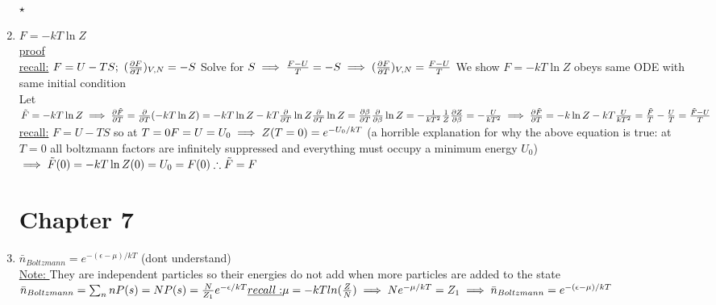 \documentclass[12pt]{amsart}
\begin{document}
\begin{enumerate}
$\star$
\item \underline{$F= - k T \ln Z$}\\
\underline{proof}\\
\underline{recall:} $F = U - TS;\,\, (\frac{\partial F}{\partial T})_{V,N} = - S\\$
Solve for $S \implies \frac{F-U}{T} = - S\\
\implies (\frac{\partial F}{\partial T})_{V,N} = \frac{F- U}{T}\\$
We show $F = - kT \ln Z$ obeys same ODE with same initial condition\\
Let $\tilde{F} = - k T \ln Z\\
\implies \frac{\partial \tilde{F}}{\partial T} = \frac{\partial}{\partial T} (- k T \ln Z) = - k T \ln Z - k T \frac{\partial}{\partial T} \ln Z\\
\frac{\partial}{\partial T} \ln Z = \frac{\partial \beta}{\partial T} \frac{\partial}{\partial \beta} \ln Z\\
=- \frac{1}{kT^2} \frac{1}{Z} \frac{\partial Z}{\partial \beta} = - \frac{U}{k T^2}\\
\implies \frac{\partial \tilde{F}}{\partial T} = - k \ln Z - k T \frac{U}{k T^2} = \frac{\tilde{F}}{T} - \frac{U}{T} = \frac{\tilde{F} - U}{T}$\\
\underline{recall:} $F= U - TS$ so at $T=0 F=U = U_0\\
\implies Z(T=0) = e^{-U_0/kT}\\$
(a horrible explanation for why the above equation is true: at $T=0$ all boltzmann factors are infinitely suppressed and everything must occupy a minimum energy $U_0$)\\
$\implies \tilde{F}(0) = - k T \ln Z(0) = U_0 = F(0)\\
\therefore \tilde{F} = F$


\hdashrule[0.5ex][c]{\linewidth}{0.5pt}{1.5mm}



\section*{Chapter 7}

\item \underline{$\bar{n}_{Boltzmann}=e^{-(\epsilon-\mu)/kT}$} (dont understand)\\
\underline{Note: } They are independent particles so their energies do not add when more particles are added to the state\\
$\bar{n}_{Boltzmann}=\sum_n n P(s)=N P(s)=\frac{N}{Z_1} e^{-\epsilon/kT}\\
\underline{recall:} \mu=-kT ln(\frac{Z}{N}) \implies N e^{-\mu/kT}=Z_1\\
\implies \bar{n}_{Boltzmann}=e^{-(\epsilon-\mu)/kT}$



\end{enumerate}
\end{document}
